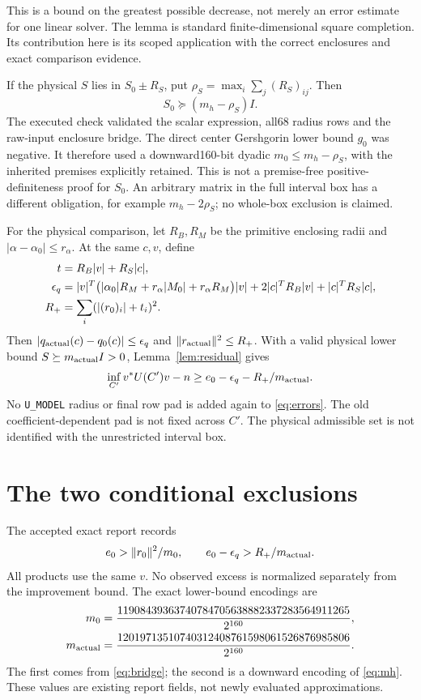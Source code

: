 \documentclass[11pt,a4paper]{article}
\newcommand{\norm}[1]{\lVert #1\rVert}
\theoremstyle{definition}
\theoremstyle{remark}
\numberwithin{equation}{section}
\begin{document}
This is a bound on the greatest possible decrease, not merely an error
estimate for one linear solver. The lemma is standard finite-dimensional
square completion. Its contribution here is its scoped application with
the correct enclosures and exact comparison evidence.

If the physical $S$ lies in $S_0\pm R_S$, put
$\rho_S=\max_i\sum_j(R_S)_{ij}$. Then
\begin{equation}\label{eq:bridge}
 S_0\succeq(m_h-\rho_S)I.
\end{equation}
The executed check validated the scalar expression, all68 radius rows and
the raw-input enclosure bridge. The direct center Gershgorin lower bound
$g_0$ was negative. It therefore used a downward160-bit dyadic
$m_0\le m_h-\rho_S$, with the inherited premises explicitly retained.
This is not a premise-free positive-definiteness proof for $S_0$.
An arbitrary matrix in the full interval box has a different obligation,
for example $m_h-2\rho_S$; no whole-box exclusion is claimed.

For the physical comparison, let $R_B,R_M$ be the primitive enclosing
radii and $|\alpha-\alpha_0|\le r_\alpha$. At the same $c,v$, define
\begin{align}\label{eq:errors}
 t&=R_B|v|+R_S|c|,\notag\\
 \epsilon_q
 &=|v|^T\bigl(|\alpha_0|R_M+r_\alpha|M_0|+r_\alpha R_M\bigr)|v|
       +2|c|^TR_B|v|+|c|^TR_S|c|,\notag\\
 R_+&=\sum_i(|(r_0)_i|+t_i)^2.
\end{align}
Then $|q_{\rm actual}(c)-q_0(c)|\le\epsilon_q$ and
$\norm{r_{\rm actual}}^2\le R_+$. With a valid physical lower bound
$S\succeq m_{\rm actual}I>0$, Lemma~\ref{lem:residual} gives
\begin{equation}\label{eq:physicalgap}
 \inf_{C'}v^*U(C')v-n
 \ge e_0-\epsilon_q-R_+/m_{\rm actual}.
\end{equation}
No \texttt{U\_MODEL} radius or final row pad is added again to
\eqref{eq:errors}. The old coefficient-dependent pad is not fixed across
$C'$. The physical admissible set is not identified with the unrestricted
interval box.

\section{The two conditional exclusions}\label{sec:result}

The accepted exact report records
\begin{equation}\label{eq:tests}
 e_0>\norm{r_0}^2/m_0,\qquad
 e_0-\epsilon_q>R_+/m_{\rm actual}.
\end{equation}
All products use the same $v$. No observed excess is normalized separately
from the improvement bound. The exact lower-bound encodings are
\begin{align}
 m_0&=\frac{11908439363740784705638882337283564911265}{2^{160}},\notag\\
 m_{\rm actual}&=\frac{12019713510740312408761598061526876985806}{2^{160}}.
\end{align}
The first comes from \eqref{eq:bridge}; the second is a downward encoding
of \eqref{eq:mh}. These values are existing report fields, not newly
evaluated approximations.
\end{document}
